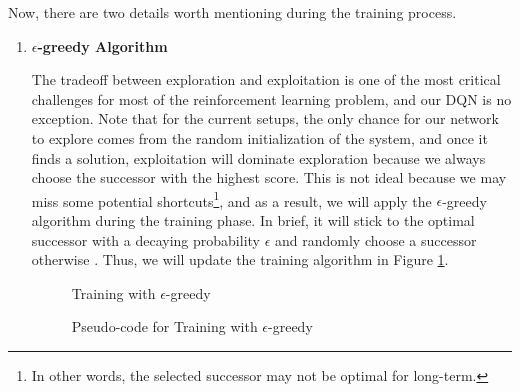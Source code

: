 \documentclass[letterpaper]{article} %
\makeatletter
\newcommand{\removelatexerror}{\let\@latex@error\@gobble}
\makeatother
\begin{document}
Now, there are two details worth mentioning during the training process.
\begin{enumerate}
  \item {\bf $\epsilon$-greedy Algorithm}
  
  The tradeoff between exploration and exploitation is one of the most critical challenges for most of the reinforcement learning problem, and our DQN is no exception. Note that for the current setups, the only chance for our network to explore comes from the random initialization of the system, and once it finds a solution, exploitation will dominate exploration because we always choose the successor with the highest score. This is not ideal because we may miss some potential shortcuts\footnote{In other words, the selected successor may not be optimal for long-term.}, and as a result, we will apply the $\epsilon$-greedy algorithm during the training phase. In brief, it will stick to the optimal successor with a decaying probability $\epsilon$ and randomly choose a successor otherwise \cite{Tokic_2010}. Thus, we will update the training algorithm in Figure \ref{fig:code2}.

  \begin{figure}[h!]
    \centering
    \begin{minipage}{.95\linewidth}
      \removelatexerror%
      \begin{algorithm}[H]
        \DontPrintSemicolon
        \caption{Training with $\epsilon$-greedy}
      \end{algorithm}
    \end{minipage}
    \caption{Pseudo-code for Training with $\epsilon$-greedy}
    \label{fig:code2}
  \end{figure}


\end{enumerate}
\end{document}
